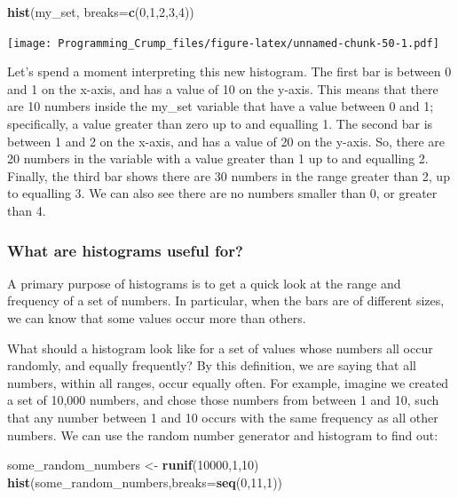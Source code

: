 \documentclass[]{book}
\newenvironment{Shaded}{\begin{snugshade}}{\end{snugshade}}
\newcommand{\KeywordTok}[1]{\textcolor[rgb]{0.13,0.29,0.53}{\textbf{{#1}}}}
\newcommand{\DataTypeTok}[1]{\textcolor[rgb]{0.13,0.29,0.53}{{#1}}}
\newcommand{\DecValTok}[1]{\textcolor[rgb]{0.00,0.00,0.81}{{#1}}}
\newcommand{\StringTok}[1]{\textcolor[rgb]{0.31,0.60,0.02}{{#1}}}
\newcommand{\NormalTok}[1]{{#1}}
\theoremstyle{definition}
\theoremstyle{definition}
\theoremstyle{definition}
\theoremstyle{remark}
\begin{document}
\begin{Shaded}
\begin{Highlighting}[]
\KeywordTok{hist}\NormalTok{(my_set, }\DataTypeTok{breaks=}\KeywordTok{c}\NormalTok{(}\DecValTok{0}\NormalTok{,}\DecValTok{1}\NormalTok{,}\DecValTok{2}\NormalTok{,}\DecValTok{3}\NormalTok{,}\DecValTok{4}\NormalTok{))}
\end{Highlighting}
\end{Shaded}

\texttt{[image: Programming\_Crump\_files/figure-latex/unnamed-chunk-50-1.pdf]}

Let's spend a moment interpreting this new histogram. The first bar is
between 0 and 1 on the x-axis, and has a value of 10 on the y-axis. This
means that there are 10 numbers inside the my\_set variable that have a
value between 0 and 1; specifically, a value greater than zero up to and
equalling 1. The second bar is between 1 and 2 on the x-axis, and has a
value of 20 on the y-axis. So, there are 20 numbers in the variable with
a value greater than 1 up to and equalling 2. Finally, the third bar
shows there are 30 numbers in the range greater than 2, up to equalling
3. We can also see there are no numbers smaller than 0, or greater than
4.

\subsubsection{What are histograms useful
for?}\label{what-are-histograms-useful-for}

A primary purpose of histograms is to get a quick look at the range and
frequency of a set of numbers. In particular, when the bars are of
different sizes, we can know that some values occur more than others.

What should a histogram look like for a set of values whose numbers all
occur randomly, and equally frequently? By this definition, we are
saying that all numbers, within all ranges, occur equally often. For
example, imagine we created a set of 10,000 numbers, and chose those
numbers from between 1 and 10, such that any number between 1 and 10
occurs with the same frequency as all other numbers. We can use the
random number generator and histogram to find out:

\begin{Shaded}
\begin{Highlighting}[]
\NormalTok{some_random_numbers <-}\StringTok{ }\KeywordTok{runif}\NormalTok{(}\DecValTok{10000}\NormalTok{,}\DecValTok{1}\NormalTok{,}\DecValTok{10}\NormalTok{)}
\KeywordTok{hist}\NormalTok{(some_random_numbers,}\DataTypeTok{breaks=}\KeywordTok{seq}\NormalTok{(}\DecValTok{0}\NormalTok{,}\DecValTok{11}\NormalTok{,}\DecValTok{1}\NormalTok{))}
\end{Highlighting}
\end{Shaded}
\end{document}
